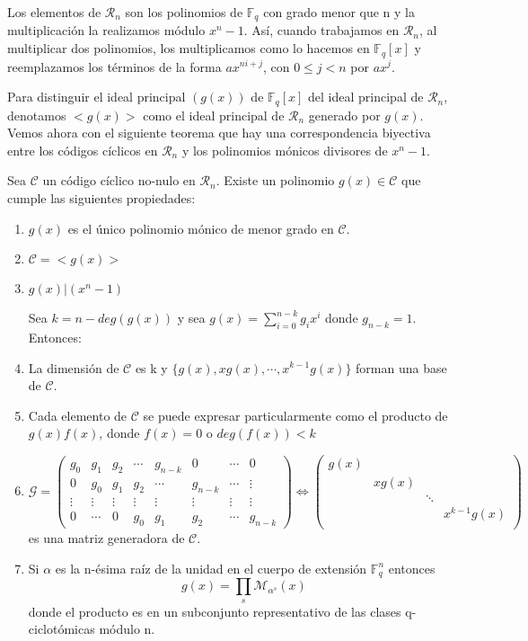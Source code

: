 Los elementos de $\mathcal{R}_n$ son los polinomios de $\mathbb{F}_q$ con grado menor que n y la multiplicación la realizamos módulo $x^n-1$. Así, cuando trabajamos en $\mathcal{R}_n$, al multiplicar dos polinomios, los multiplicamos como lo hacemos en $\mathbb{F}_q[x]$ y reemplazamos los términos de la forma $ax^{ni+j}$, con $ 0 \leq j < n$ por $ax^j$.

Para distinguir el ideal principal $(g(x))$ de $\mathbb{F}_q[x]$ del ideal principal de $\mathcal{R}_n$, denotamos $<g(x)>$ como el ideal principal de $\mathcal{R}_n$ generado por $g(x)$. Vemos ahora con el siguiente teorema que hay una correspondencia biyectiva entre los códigos cíclicos en $\mathcal{R}_n$ y los polinomios mónicos divisores de $x^n-1$.


\begin{theorem}
\label{th:base_ciclicos}
Sea $\mathcal{C} $ un código cíclico no-nulo en $\mathcal{R}_n$. Existe un polinomio $g(x) \in \mathcal{C}$ que cumple las siguientes propiedades:
\begin{enumerate}
	\item $g(x)$ es el único polinomio mónico de menor grado en $\mathcal{C}$.
	\item $\mathcal{C} = <g(x)>$
	\item $g(x) | (x^n-1)$
	
	Sea $k = n - deg(g(x))$ y sea $g(x) = \sum_{i=0}^{n-k}g_ix^i$ donde $g_{n-k} = 1$. Entonces:
	\item La dimensión de $\mathcal{C}$ es k y $\{g(x),xg(x),\cdots,x^{k-1}g(x)\}$ forman una base de $\mathcal{C}$.
	\item Cada elemento de $\mathcal{C}$ se puede expresar particularmente como el producto de $g(x)f(x)$, donde $f(x) = 0$ o $deg(f(x)) < k$
	\item 	
	
	$\mathcal{G} = \begin{pmatrix}
			g_0 & g_1 & g_2 & \cdots & g_{n-k} & 0 & \cdots & 0 \\
			0 & g_0 & g_1 & g_2 & \cdots & g_{n-k} & \cdots & \vdots \\
			\vdots & \vdots & \vdots & \vdots & \vdots &\vdots & \vdots & \vdots \\
			0 & \cdots & 0 & g_0 & g_1 & g_2 & \cdots & g_{n-k} 
	\end{pmatrix} \Leftrightarrow \begin{pmatrix}
			g(x) &  &  &   \\
			 & xg(x)  &  &   \\
			 &  & \ddots &   \\
			 &  &  & x^{k-1}g(x)  \\
	\end{pmatrix}$ 
	es una matriz generadora de $\mathcal{C}$.
	\item Si $\alpha$ es la n-ésima raíz de la unidad en el cuerpo de extensión $\mathbb{F}_q^n$ entonces \[ 
	g(x) = \prod_s \mathcal{M}_{\alpha^s} (x)
	\]
	donde el producto es en un subconjunto representativo de las clases q-ciclotómicas módulo n.	
\end{enumerate}
\end{theorem}

